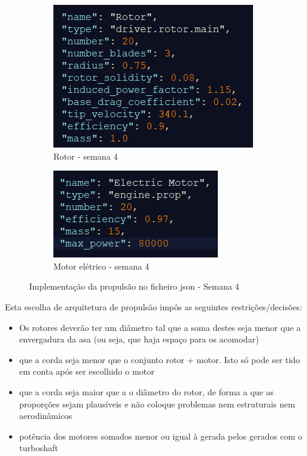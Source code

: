 \begin{figure}[h]
    \centering
    \begin{subfigure}[h]{0.33\textwidth}
        \includegraphics[width=\textwidth]{Imagens/rotor semana 4.PNG}
        \caption{Rotor - semana 4}
        \label{}
    \end{subfigure}
    \hfill
    \begin{subfigure}[h]{0.33\textwidth}
        \includegraphics[width=\textwidth]{Imagens/motor semana 4.PNG}
        \caption{Motor elétrico - semana 4}
        \label{}
    \end{subfigure}
    \caption{Implementação da propulsão no ficheiro json - Semana 4}
    \label{propulsoasemana4json}
\end{figure}
\FloatBarrier
Esta escolha de arquitetura de propulsão impôs as seguintes restrições/decisões:
\begin{itemize}
    \item Os rotores deverão ter um diâmetro tal que a soma destes seja menor que a envergadura da asa (ou seja, que haja espaço para os acomodar)
    \item que a corda seja menor que o conjunto rotor + motor. Isto só pode ser tido em conta após ser escolhido o motor
    \item que a corda seja maior que a o diâmetro do rotor, de forma a que as proporções sejam plausíveis e não coloque problemas nem estruturais nem aerodinâmicos
    \item potência dos motores somados menor ou igual à gerada pelos gerados com o turboshaft
\end{itemize}
